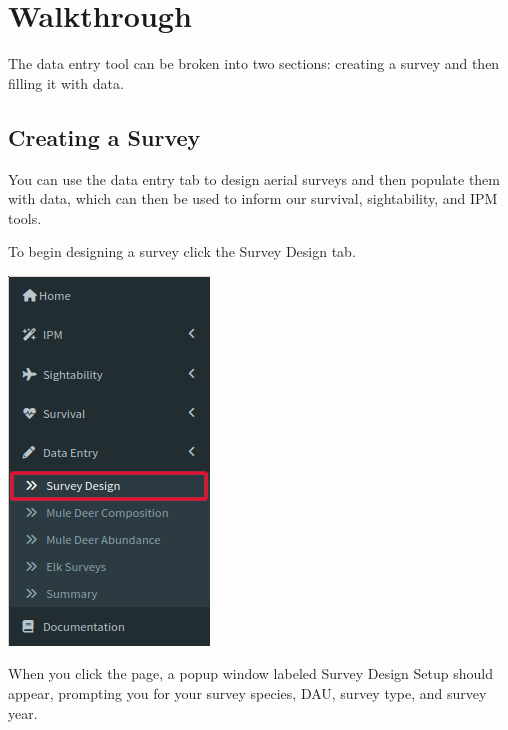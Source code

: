 \documentclass[
]{book}
\begin{document}
\hypertarget{de-walk}{%
\section{Walkthrough}\label{de-walk}}

The data entry tool can be broken into two sections: creating a survey and then filling it with data.

\hypertarget{de-create}{%
\subsection{Creating a Survey}\label{de-create}}

You can use the data entry tab to design aerial surveys and then populate them with data, which can then be used to inform our survival, sightability, and IPM tools.

To begin designing a survey click the Survey Design tab.

\includegraphics{./www/de_walk1.png}

When you click the page, a popup window labeled Survey Design Setup should appear, prompting you for your survey species, DAU, survey type, and survey year.
\end{document}
